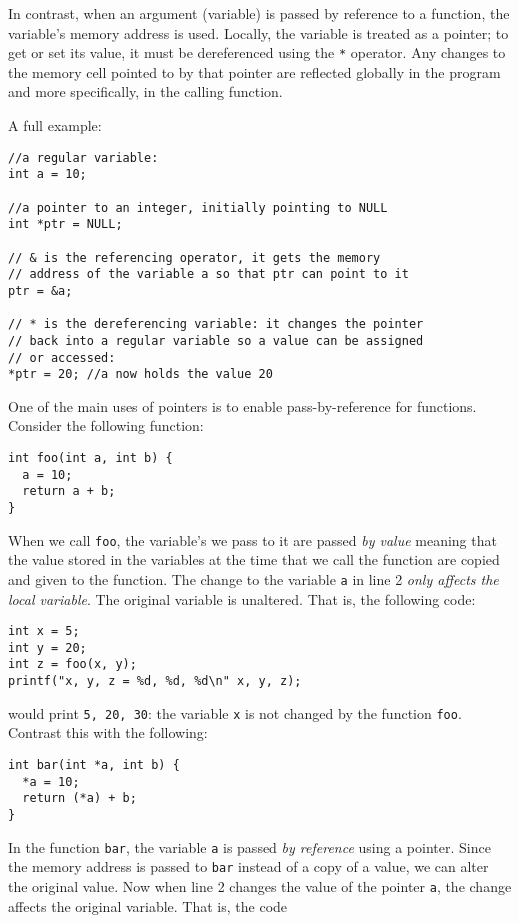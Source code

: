 \documentclass[12pt]{scrartcl}
\begin{document}
In contrast, when an argument (variable) is passed by reference to a 
function, the variable's memory address is used.  Locally, the variable 
is treated as a pointer; to get or set its value, it must be dereferenced 
using the \texttt{*} operator.  Any changes to the memory cell pointed to by 
that pointer are reflected globally in the program and more specifically, 
in the calling function.

A full example:

\begin{verbatim}
//a regular variable:
int a = 10; 

//a pointer to an integer, initially pointing to NULL
int *ptr = NULL; 

// & is the referencing operator, it gets the memory 
// address of the variable a so that ptr can point to it
ptr = &a; 

// * is the dereferencing variable: it changes the pointer
// back into a regular variable so a value can be assigned
// or accessed:
*ptr = 20; //a now holds the value 20
\end{verbatim}

One of the main uses of pointers is to enable pass-by-reference 
for functions.  Consider the following function:

\begin{verbatim}
int foo(int a, int b) {
  a = 10;
  return a + b;
}
\end{verbatim}

When we call \texttt{foo}, the variable's we pass to it are passed
\emph{by value} meaning that the value stored in the variables at the
time that we call the function are copied and given to the function.  The
change to the variable \texttt{a} in line 2 \emph{only affects
the local variable}.  The original variable is unaltered.  That is, the following
code:

\begin{verbatim}
int x = 5;
int y = 20;
int z = foo(x, y);
printf("x, y, z = %d, %d, %d\n" x, y, z);
\end{verbatim}

would print \texttt{5, 20, 30}: the variable \texttt{x} is not
changed by the function \texttt{foo}.  Contrast this with the following:

\begin{verbatim}
int bar(int *a, int b) {
  *a = 10;
  return (*a) + b;
}
\end{verbatim}

In the function \texttt{bar}, the variable \texttt{a} is passed
\emph{by reference} using a pointer.  Since the memory address is passed
to \texttt{bar} instead of a copy of a value, we can alter the original
value.  Now when line 2 changes the value of the pointer \texttt{a}, 
the change affects the original variable.  That is, the code 
\end{document}
